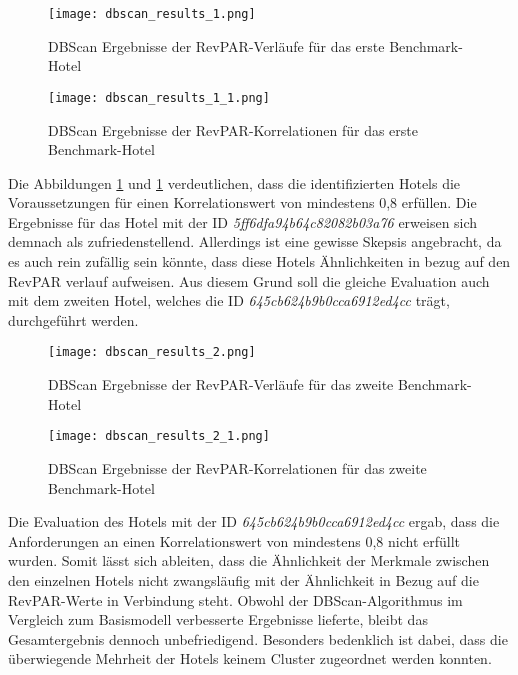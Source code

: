 \begin{figure}[h]
    \centering
    \texttt{[image: dbscan\_results\_1.png]}
    \caption[DBScan Ergebnisse der RevPAR-Verläufe für das erste Benchmark-Hotel]{DBScan Ergebnisse der RevPAR-Verläufe für das erste Benchmark-Hotel}
    \label{img:dbscan_results_1}
\end{figure}

\begin{figure}[h]
    \centering
    \texttt{[image: dbscan\_results\_1\_1.png]}
    \caption[DBScan Ergebnisse der RevPAR-Korrelationen für das erste Benchmark-Hotel]{DBScan Ergebnisse der RevPAR-Korrelationen für das erste Benchmark-Hotel}
    \label{img:dbscan_results_1_1}
\end{figure}

Die Abbildungen \ref{img:dbscan_results_1} und \ref{img:dbscan_results_1} verdeutlichen, dass die identifizierten Hotels die Voraussetzungen für einen Korrelationswert von mindestens 0,8 erfüllen. Die Ergebnisse für das Hotel mit der ID \emph{5ff6dfa94b64c82082b03a76} erweisen sich demnach als zufriedenstellend. Allerdings ist eine gewisse Skepsis angebracht, da es auch rein zufällig sein könnte, dass diese Hotels Ähnlichkeiten in bezug auf den RevPAR verlauf aufweisen. Aus diesem Grund soll die gleiche Evaluation auch mit dem zweiten Hotel, welches die ID \emph{645cb624b9b0cca6912ed4cc} trägt, durchgeführt werden.

\begin{figure}[h]
    \centering
    \texttt{[image: dbscan\_results\_2.png]}
    \caption[DBScan Ergebnisse der RevPAR-Verläufe für das zweite Benchmark-Hotel]{DBScan Ergebnisse der RevPAR-Verläufe für das zweite Benchmark-Hotel}
    \label{img:dbscan_results_2}
\end{figure}

\begin{figure}[h]
    \centering
    \texttt{[image: dbscan\_results\_2\_1.png]}
    \caption[DBScan Ergebnisse der RevPAR-Korrelationen für das zweiten Benchmark-Hotel]{DBScan Ergebnisse der RevPAR-Korrelationen für das zweite Benchmark-Hotel}
    \label{img:dbscan_results_2_1}
\end{figure}

Die Evaluation des Hotels mit der ID \emph{645cb624b9b0cca6912ed4cc} ergab, dass die Anforderungen an einen Korrelationswert von mindestens 0,8 nicht erfüllt wurden. Somit lässt sich ableiten, dass die Ähnlichkeit der Merkmale zwischen den einzelnen Hotels nicht zwangsläufig mit der Ähnlichkeit in Bezug auf die RevPAR-Werte in Verbindung steht. 
\newline
\newline
Obwohl der DBScan-Algorithmus im Vergleich zum Basismodell verbesserte Ergebnisse lieferte, bleibt das Gesamtergebnis dennoch unbefriedigend. Besonders bedenklich ist dabei, dass die überwiegende Mehrheit der Hotels keinem Cluster zugeordnet werden konnten.

